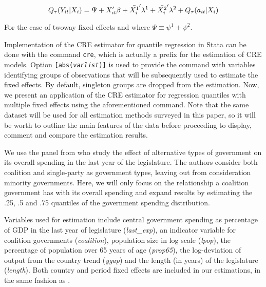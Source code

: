 \documentclass{article}
\begin{document}
\begin{equation}\label{eq:qr_cre_twoway}
    Q_{\tau}(Y_{it} | X_i) = \Psi + X_{it}' \beta + \Bar{X^1_i}' \lambda^1 + \Bar{X^2_i}' \lambda^2 + Q_{\tau}(a_{it} | X_i)
\end{equation}

For the case of twoway fixed effects and where $\Psi \equiv \psi^1 + \psi^2$. 

Implementation of the CRE estimator for quantile regression in Stata can be done with the command \texttt{cre}, which is actually a prefix for the estimation of CRE models. Option \texttt{[abs(\textit{varlist})]} is used to provide the command with variables identifying groups of observations that will be subsequently used to estimate the fixed effects. By default, singleton groups are dropped from the estimation. Now, we present an application of the CRE estimator for regression quantiles with multiple fixed effects using the aforementioned command. Note that the same dataset will be used for all estimation methods surveyed in this paper, so it will be worth to outline the main features of the data before proceeding to display, comment and compare the estimation results.

We use the panel from \cite{persson2007} who study the effect of alternative types of government on its overall spending in the last year of the legislature. The authors consider both coalition and single-party as government types, leaving out from consideration minority governments. Here, we will only focus on the relationship a coalition government has with its overall spending and expand \cite{persson2007} results by estimating the .25, .5 and .75 quantiles of the government spending distribution.

Variables used for estimation include central government spending as percentage of GDP in the last year of legislature (\textit{last\_exp}), an indicator variable for coalition governments (\textit{coalition}), population size in log scale (\textit{lpop}), the percentage of population over 65 years of age (\textit{prop65}), the log-deviation of output from the country trend (\textit{ygap}) and the length (in years) of the legislature (\textit{length}). Both country and period fixed effects are included in our estimations, in the same fashion as \cite{persson2007}. 
\end{document}
